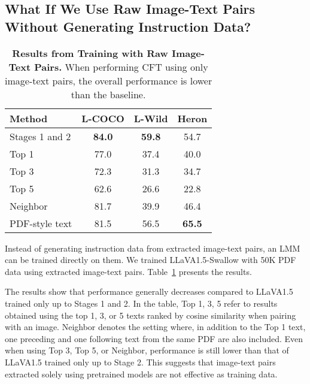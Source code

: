\subsection{What If We Use Raw Image-Text Pairs Without Generating Instruction Data?}\label{subsec:paired-text-train}
\begin{table}[t]
    \centering
    \begin{adjustbox}{width=0.8\linewidth}
    \begin{tabular}{@{}lccc@{}}
        \toprule
        \textbf{Method} & \textbf{L-COCO} & \textbf{L-Wild} &  \textbf{Heron} \\
        \midrule
        Stages 1 and 2 & \textbf{84.0} & \textbf{59.8} & 54.7 \\ 
        \midrule
        Top 1 & 77.0 & 37.4 & 40.0 \\ 
        Top 3 & 72.3 & 31.3 & 34.7 \\ 
        Top 5 & 62.6 & 26.6 & 22.8 \\ 
        Neighbor & 81.7 & 39.9 & 46.4 \\ 
        \midrule
        PDF-style text & 81.5 & 56.5 & \textbf{65.5} \\
        \bottomrule
    \end{tabular}
    \end{adjustbox}
    \vspace{-2mm}
    \caption{\textbf{Results from Training with Raw Image-Text Pairs.}
When performing CFT using only image-text pairs, the overall performance is lower than the baseline.
    }
    \label{tab:paired}
\end{table}

Instead of generating instruction data from extracted image-text pairs, an LMM can be trained directly on them. We trained LLaVA1.5-Swallow with 50K PDF data using extracted image-text pairs. Table~\ref{tab:paired} presents the results.

The results show that performance generally decreases compared to LLaVA1.5 trained only up to Stages 1 and 2.
In the table, Top 1, 3, 5 refer to results obtained using the top 1, 3, or 5 texts ranked by cosine similarity when pairing with an image.
Neighbor denotes the setting where, in addition to the Top 1 text, one preceding and one following text from the same PDF are also included.
Even when using Top 3, Top 5, or Neighbor, performance is still lower than that of LLaVA1.5 trained only up to Stage 2.
This suggests that image-text pairs extracted solely using pretrained models are not effective as training data.

